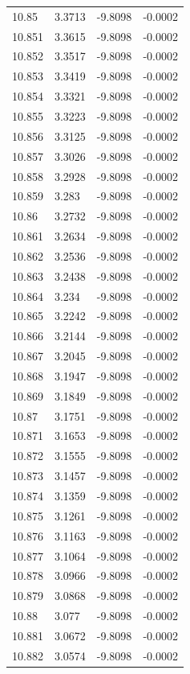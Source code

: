 \begin{tabular}{llll}
10.85 & 3.3713 & -9.8098 & -0.0002 \\
10.851 & 3.3615 & -9.8098 & -0.0002 \\
10.852 & 3.3517 & -9.8098 & -0.0002 \\
10.853 & 3.3419 & -9.8098 & -0.0002 \\
10.854 & 3.3321 & -9.8098 & -0.0002 \\
10.855 & 3.3223 & -9.8098 & -0.0002 \\
10.856 & 3.3125 & -9.8098 & -0.0002 \\
10.857 & 3.3026 & -9.8098 & -0.0002 \\
10.858 & 3.2928 & -9.8098 & -0.0002 \\
10.859 & 3.283 & -9.8098 & -0.0002 \\
10.86 & 3.2732 & -9.8098 & -0.0002 \\
10.861 & 3.2634 & -9.8098 & -0.0002 \\
10.862 & 3.2536 & -9.8098 & -0.0002 \\
10.863 & 3.2438 & -9.8098 & -0.0002 \\
10.864 & 3.234 & -9.8098 & -0.0002 \\
10.865 & 3.2242 & -9.8098 & -0.0002 \\
10.866 & 3.2144 & -9.8098 & -0.0002 \\
10.867 & 3.2045 & -9.8098 & -0.0002 \\
10.868 & 3.1947 & -9.8098 & -0.0002 \\
10.869 & 3.1849 & -9.8098 & -0.0002 \\
10.87 & 3.1751 & -9.8098 & -0.0002 \\
10.871 & 3.1653 & -9.8098 & -0.0002 \\
10.872 & 3.1555 & -9.8098 & -0.0002 \\
10.873 & 3.1457 & -9.8098 & -0.0002 \\
10.874 & 3.1359 & -9.8098 & -0.0002 \\
10.875 & 3.1261 & -9.8098 & -0.0002 \\
10.876 & 3.1163 & -9.8098 & -0.0002 \\
10.877 & 3.1064 & -9.8098 & -0.0002 \\
10.878 & 3.0966 & -9.8098 & -0.0002 \\
10.879 & 3.0868 & -9.8098 & -0.0002 \\
10.88 & 3.077 & -9.8098 & -0.0002 \\
10.881 & 3.0672 & -9.8098 & -0.0002 \\
10.882 & 3.0574 & -9.8098 & -0.0002 \\

\end{tabular}
